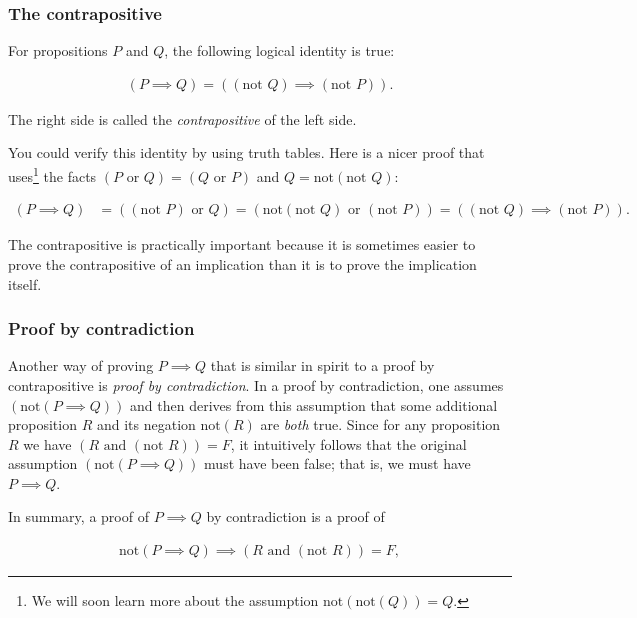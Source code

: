 \subsubsection*{The contrapositive}

For propositions $P$ and $Q$, the following logical identity is true:

\begin{align*}
    (P \implies Q) = ((\text{not } Q) \implies (\text{not } P)).
\end{align*}

The right side is called the \textit{contrapositive} of the left side.

You could verify this identity by using truth tables. Here is a nicer proof that uses\footnote{We will soon learn more about the assumption $\text{not}(\text{not}(Q)) = Q$.} the facts $(P \text{ or } Q) = (Q \text{ or } P)$ and $Q = \text{not}(\text{not } Q)$:

\begin{align*}
    (P \implies Q) &= ((\text{not } P) \text{ or } Q ) 
    = (\text{not}(\text{not } Q) \text{ or } (\text{not } P))
    = ((\text{not } Q) \implies (\text{not } P)).
\end{align*}

The contrapositive is practically important because it is sometimes easier to prove the contrapositive of an implication than it is to prove the implication itself.

\subsubsection*{Proof by contradiction}

Another way of proving $P \implies Q$ that is similar in spirit to a proof by contrapositive is \textit{proof by contradiction}. In a proof by contradiction, one assumes $(\text{not}(P \implies Q))$ and then derives from this assumption that some additional proposition $R$ and its negation $\text{not}(R)$ are \textit{both} true. Since for any proposition $R$ we have $(R \text{ and } (\text{not } R)) = F$, it intuitively follows that the original assumption $(\text{not}(P \implies Q))$ must have been false; that is, we must have $P \implies Q$.

In summary, a proof of $P \implies Q$ by contradiction is a proof of

\begin{align*}
    \text{not}(P \implies Q) \implies (R \text{ and } (\text{not } R)) = F,
\end{align*}

